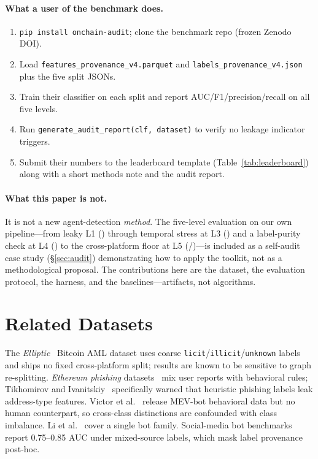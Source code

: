 \documentclass[10pt]{article}
\begin{document}
\paragraph{What a user of the benchmark does.}
\begin{enumerate}
    \item \texttt{pip install onchain-audit}; clone the benchmark repo (frozen Zenodo DOI).
    \item Load \texttt{features\_provenance\_v4.parquet} and \texttt{labels\_provenance\_v4.json} plus the five split JSONs.
    \item Train their classifier on each split and report AUC/F1/precision/recall on all five levels.
    \item Run \texttt{generate\_audit\_report(clf, dataset)} to verify no leakage indicator triggers.
    \item Submit their numbers to the leaderboard template (Table~\ref{tab:leaderboard}) along with a short methods note and the audit report.
\end{enumerate}

\paragraph{What this paper is not.}
It is not a new agent-detection \emph{method}. The five-level evaluation on our own pipeline---from leaky L1 (\cascadeLevelLeakyAuc{}) through temporal stress at L3 (\temporalHoldoutRfAuc{}) and a label-purity check at L4 (\cascadeLevelStrictCoreAuc{}) to the cross-platform floor at L5 (\lopoRfPooledAuc{}/\mixedClassLopoRfAuc{})---is included as a self-audit case study (\S\ref{sec:audit}) demonstrating how to apply the toolkit, not as a methodological proposal. The contributions here are the dataset, the evaluation protocol, the harness, and the baselines---artifacts, not algorithms.

\section{Related Datasets}
\label{sec:related}

The \emph{Elliptic}~\cite{weber2019antimoney} Bitcoin AML dataset uses coarse \texttt{licit}/\texttt{illicit}/\texttt{unknown} labels and ships no fixed cross-platform split; results are known to be sensitive to graph re-splitting. \emph{Ethereum phishing} datasets~\cite{patel2021phishing} mix user reports with behavioral rules; Tikhomirov and Ivanitskiy~\cite{tikhomirov2021phishing} specifically warned that heuristic phishing labels leak address-type features. Victor et al.~\cite{victor2023fingerprinting} release MEV-bot behavioral data but no human counterpart, so cross-class distinctions are confounded with class imbalance. Li et al.~\cite{li2024telegram} cover a single bot family. Social-media bot benchmarks~\cite{cresci2017paradigm,varol2017online} report 0.75--0.85 AUC under mixed-source labels, which mask label provenance post-hoc.
\end{document}
